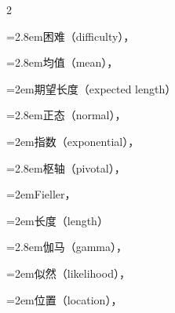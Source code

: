 \begin{multicols}{2}
\par\noindent\hangindent=2.8em\hspace*{1.8em}\label{idx:147}困难（difficulty），\hyperref[idxocc:147:396]{\pageref*{idxocc:147:396}}\par
\par\noindent\hangindent=2.8em\hspace*{1.8em}\label{idx:148}均值（mean），\hyperref[ex:9.3.13]{\pageref*{ex:9.3.13}}\par
{}
\par\noindent\hangindent=2em\hspace*{1em}\label{idx:149}期望长度（expected length）\par
\par\noindent\hangindent=2.8em\hspace*{1.8em}\label{idx:150}正态（normal），\hyperref[ex:9.3.3]{\pageref*{ex:9.3.3}}\par
\par\noindent\hangindent=2em\hspace*{1em}\label{idx:151}指数（exponential），\hyperref[ex:9.2.13]{\pageref*{ex:9.2.13}}\par
\par\noindent\hangindent=2.8em\hspace*{1.8em}\label{idx:152}枢轴（pivotal），\hyperref[ex:9.2.9]{\pageref*{ex:9.2.9}}\par
\par\noindent\hangindent=2em\hspace*{1em}\label{idx:153}Fieller，\hyperref[sec:9.5.3]{\pageref*{sec:9.5.3}}\par
{}
\par\noindent\hangindent=2em\hspace*{1em}\label{idx:154}长度（length）\par
\par\noindent\hangindent=2.8em\hspace*{1.8em}\label{idx:155}伽马（gamma），\hyperref[ex:9.3.4]{\pageref*{ex:9.3.4}}\par
\par\noindent\hangindent=2em\hspace*{1em}\label{idx:156}似然（likelihood），\hyperref[eq:9.2.7]{\pageref*{eq:9.2.7}}\par
\par\noindent\hangindent=2em\hspace*{1em}\label{idx:157}位置（location），\hyperref[exercise:9.51]{\pageref*{exercise:9.51}}\par

\end{multicols}
